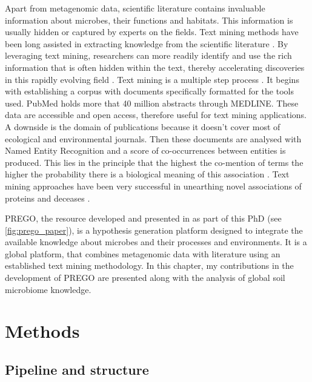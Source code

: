 Apart from metagenomic data, scientific literature contains invaluable information
about microbes, their functions and habitats. This information is usually hidden 
or captured by experts on the fields. 
Text mining methods have been long assisted in extracting knowledge from 
the scientific literature \parencite{jensen2006Literature}. 
By leveraging text mining, researchers can more readily identify and use the rich information that
is often hidden within the text, thereby accelerating discoveries in this
rapidly evolving field \parencite{badal2019Challenges}. Text mining is a multiple step
process \parencite{10.5555/1199003}. It begins with establishing a corpus with 
documents specifically formatted for the tools used. PubMed \parencite{roberts2001pubmed}
holds more that 40 million abstracts through MEDLINE. These data are accessible 
and open access, therefore useful for text mining applications. A downside is the 
domain of publications because it doesn't cover most of ecological and environmental 
journals. Then these documents are analysed with Named Entity Recognition and a 
score of co-occurrences between entities is produced. This lies in the principle 
that the highest the co-mention of terms the higher the probability there is 
a biological meaning of this association \parencite{jensen2006Literature}.
Text mining approaches have been very successful in unearthing novel 
associations of proteins and deceases \parencite{pletscher2015diseases}.

PREGO, the resource developed and presented in \textcite{microorganisms10020293}
as part of this PhD (see \ref{fig:prego_paper}), is a hypothesis generation platform designed to integrate the 
available knowledge about microbes and their processes and environments. 
It is a global platform, that combines metagenomic data with literature
using an established text mining methodology. 
In this chapter, my contributions in the development of PREGO are presented along with the analysis of global 
soil microbiome knowledge.

\section{Methods}
\label{sec:prego-methods}

   \subsection{Pipeline and structure}
   \label{subsec:prego-pipeline}

